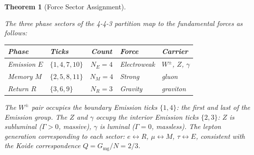 \documentclass[11pt,letterpaper]{article}
\theoremstyle{plain}
\newtheorem{theorem}{Theorem}[section]
\theoremstyle{definition}
\theoremstyle{remark}
\newcommand{\Tcharge}{\Gamma}
\newcommand{\Gmg}{G_{\mathrm{mg}}}
\begin{document}
\begin{theorem}[Force Sector Assignment]\label{thm:forcemap}
\begin{rsbox}
The three phase sectors of the 4-4-3 partition map to the
fundamental forces as follows:
\begin{center}
\renewcommand{\arraystretch}{1.35}
\begin{tabular}{llcll}
\toprule
\textbf{Phase} & \textbf{Ticks} & \textbf{Count} &
\textbf{Force} & \textbf{Carrier} \\
\midrule
Emission $E$ & $\{1,4,7,10\}$ & $N_E=4$ &
  Electroweak & $W^\pm$, $Z$, $\gamma$ \\
Memory $M$ & $\{2,5,8,11\}$ & $N_M=4$ &
  Strong & gluon \\
Return $R$ & $\{3,6,9\}$ & $N_R=3$ &
  Gravity & graviton \\
\bottomrule
\end{tabular}
\end{center}
The $W^\pm$ pair occupies the boundary Emission ticks $\{1,4\}$:
the first and last of the Emission group.  The $Z$ and $\gamma$
occupy the interior Emission ticks $\{2,3\}$: $Z$ is subluminal
($\Tcharge>0$, massive), $\gamma$ is luminal ($\Tcharge=0$,
massless).  The lepton generation corresponding to each sector:
$e\leftrightarrow R$, $\mu\leftrightarrow M$,
$\tau\leftrightarrow E$, consistent with the Koide correspondence
$Q=\Gmg/N=2/3$.
\end{rsbox}
\end{theorem}
\end{document}

